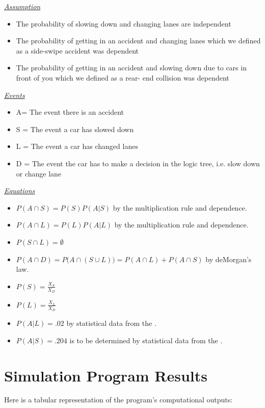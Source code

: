 \documentclass{amsart}
\begin{document}
			\underline{\textit{Assumption}}
			\begin{itemize}
				\item The probability of slowing down and changing lanes are independent
				\item The probability of getting in an accident and changing lanes which we defined as a side-swipe accident was dependent
				\item The probability of getting in an accident and slowing down due to cars in front of you which we defined as a rear- end collision was dependent
			\end{itemize}
			\underline{\textit{Events}}
			\begin{itemize}
				\item A= The event there is an accident
				\item S = The event a car has slowed down
				\item L = The event a car has changed lanes
				\item D = The event the car has to make a decision in the logic tree, i.e. slow down or change lane
			\end{itemize}
			\underline{\textit{Equations}}
			\begin{itemize}
				\item $P(A \cap S) = P(S)P(A|S)$ by the multiplication rule and dependence.
				\item $P(A \cap L) = P(L)P(A|L)$ by the multiplication rule and dependence.
				\item $P(S \cap L) = \emptyset$
				\item $P(A \cap D) = P\big(A \cap (S \cup L)\big)= P(A \cap L) + P(A \cap S)$ by deMorgan's law.
				\item $P(S) = \frac{X_S}{X_D}$
				\item $P(L) = \frac{X_L}{X_D}$
				\item $P(A|L)= .02$  by statistical data from the \cite{GovStats}.
				\item $P(A|S)= .204$ is to be determined by statistical data from the \cite{GovStats}.
			\end{itemize}
		
\section{\bfseries{Simulation Program Results}}

	Here is a tabular representation of the program's computational outputs:
\end{document}
